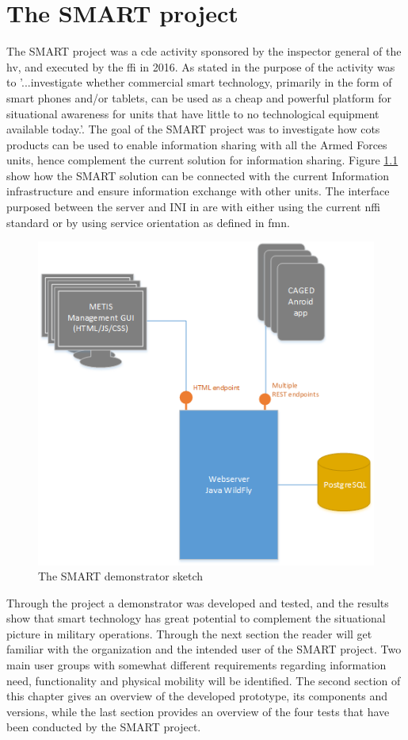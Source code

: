 \chapter{The SMART project}
The SMART project was a \gls{cde} activity sponsored by the inspector general of the \gls{hv}, and executed by the \gls{ffi} in 2016. As stated in \cite{ep1667_bakgrunn} the purpose of the activity was to '...investigate whether commercial smart technology, primarily in the form of smart phones and/or tablets, can be used as a cheap and powerful platform for situational awareness for units that have little to no technological equipment available today.'. The goal of the SMART project was to investigate how \gls{cots} products can be used to enable information sharing with all the Armed Forces units, hence complement the current solution for information sharing. Figure \ref{fig:SMART_demo_sketch} show how the SMART solution can be connected with the current Information infrastructure and ensure information exchange with other units. The interface purposed between the server and INI in \cite{ep1667_bakgrunn} are with either using the current \gls{nffi} standard or by using service orientation as defined in \gls{fmn}. 

\begin{figure}
\label{fig:SMART_demo_sketch}
\centering
\includegraphics[width=0.8\columnwidth]{content/img/Titans_system_sketch.png}
\caption{The SMART demonstrator sketch \cite{ep1667_bakgrunn}}
\end{figure}

Through the project a demonstrator was developed and tested, and the results show that smart technology has great potential to complement the situational picture in military operations.
Through the next section the reader will get familiar with the organization and the intended user of the SMART project. Two main user groups with somewhat different requirements regarding information need, functionality and physical mobility will be identified. The second section of this chapter gives an overview of the developed prototype, its components and versions, while the last section provides an overview of the four tests that have been conducted by the SMART project. 


